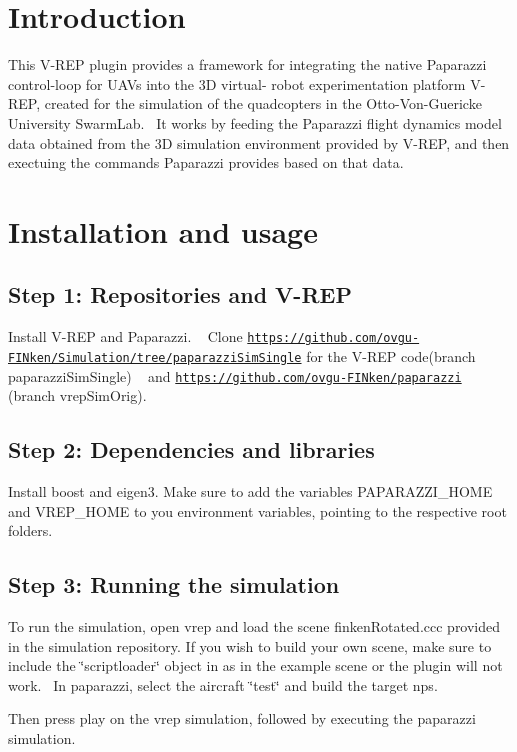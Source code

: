 \hypertarget{index_intro_sec}{}\section{Introduction}\label{index_intro_sec}
This V-\/\+R\+EP plugin provides a framework for integrating the native Paparazzi control-\/loop for U\+A\+Vs into the 3D virtual-\/ robot experimentation platform V-\/\+R\+EP, created for the simulation of the quadcopters in the Otto-\/\+Von-\/\+Guericke University Swarm\+Lab.~\newline
 It works by feeding the Paparazzi flight dynamics model data obtained from the 3D simulation environment provided by V-\/\+R\+EP, and then exectuing the commands Paparazzi provides based on that data.\hypertarget{index_install_sec}{}\section{Installation and usage}\label{index_install_sec}
\hypertarget{index_step1}{}\subsection{Step 1\+: Repositories and V-\/\+R\+EP}\label{index_step1}
Install V-\/\+R\+EP and Paparazzi. ~\newline
 Clone \href{https://github.com/ovgu-FINken/Simulation/tree/paparazziSimSingle}{\tt https\+://github.\+com/ovgu-\/\+F\+I\+Nken/\+Simulation/tree/paparazzi\+Sim\+Single} for the V-\/\+R\+EP code(branch paparazzi\+Sim\+Single) ~\newline
 and \href{https://github.com/ovgu-FINken/paparazzi}{\tt https\+://github.\+com/ovgu-\/\+F\+I\+Nken/paparazzi} (branch vrep\+Sim\+Orig).\hypertarget{index_step2}{}\subsection{Step 2\+: Dependencies and libraries}\label{index_step2}
Install boost and eigen3. Make sure to add the variables P\+A\+P\+A\+R\+A\+Z\+Z\+I\+\_\+\+H\+O\+ME and V\+R\+E\+P\+\_\+\+H\+O\+ME to you environment variables, pointing to the respective root folders.\hypertarget{index_step3}{}\subsection{Step 3\+: Running the simulation}\label{index_step3}
To run the simulation, open vrep and load the scene finken\+Rotated.\+ccc provided in the simulation repository. If you wish to build your own scene, make sure to include the \char`\"{}scriptloader\char`\"{} object in as in the example scene or the plugin will not work.~\newline
 In paparazzi, select the aircraft \char`\"{}test\char`\"{} and build the target nps.

Then press play on the vrep simulation, followed by executing the paparazzi simulation. 